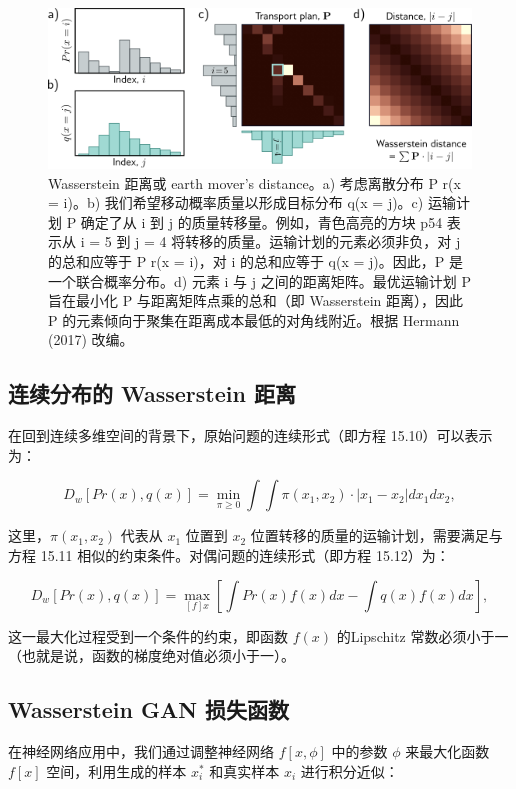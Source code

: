 \begin{figure}[ht!]
\centering
\includegraphics[width=0.7\linewidth]{png/chapter15/GANWassersteinDist.png}
\caption{Wasserstein 距离或 earth mover’s distance。a) 考虑离散分布 P r(x = i)。b) 我们希望移动概率质量以形成目标分布 q(x = j)。c) 运输计划 P 确定了从 i 到 j 的质量转移量。例如，青色高亮的方块 p54 表示从 i = 5 到 j = 4 将转移的质量。运输计划的元素必须非负，对 j 的总和应等于 P r(x = i)，对 i 的总和应等于 q(x = j)。因此，P 是一个联合概率分布。d) 元素 i 与 j 之间的距离矩阵。最优运输计划 P 旨在最小化 P 与距离矩阵点乘的总和（即 Wasserstein 距离），因此 P 的元素倾向于聚集在距离成本最低的对角线附近。根据 Hermann (2017) 改编。}
\end{figure}



\subsection{连续分布的 Wasserstein 距离}
在回到连续多维空间的背景下，原始问题的连续形式（即方程 15.10）可以表示为：

\begin{equation}
D_w [Pr(x), q(x)] = \min_{\pi \geq 0} \int \int \pi(x_1, x_2) \cdot |x_1 - x_2| dx_1 dx_2 , 
\end{equation}

这里，\(\pi(x_1, x_2)\) 代表从 \(x_1\) 位置到 \(x_2\) 位置转移的质量的运输计划，需要满足与方程 15.11 相似的约束条件。对偶问题的连续形式（即方程 15.12）为：

\begin{equation}
D_w [Pr(x), q(x)] = \max_{[f]x} \left[ \int Pr(x)f(x)dx - \int q(x)f(x)dx \right] , 
\end{equation}

这一最大化过程受到一个条件的约束，即函数 \(f(x)\) 的Lipschitz 常数必须小于一（也就是说，函数的梯度绝对值必须小于一）。

\subsection{Wasserstein GAN 损失函数}
在神经网络应用中，我们通过调整神经网络 \(f[x, \phi]\) 中的参数 \(\phi\) 来最大化函数 \(f[x]\) 空间，利用生成的样本 \(x_i^*\) 和真实样本 \(x_i\) 进行积分近似：


